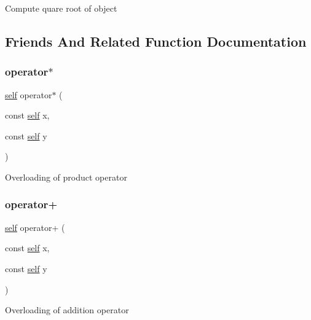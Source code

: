 Compute quare root of object 

\subsection{Friends And Related Function Documentation}
\mbox{\label{classez_1_1objects_1_1Real_a4f9af882c7a074ed8e1f8da41bd31dc9}} 
\subsubsection{\texorpdfstring{operator$\ast$}{operator*}}
{\footnotesize\ttfamily \hyperlink{classez_1_1objects_1_1Real}{self} operator$\ast$ (\begin{DoxyParamCaption}\item[{const \hyperlink{classez_1_1objects_1_1Real}{self}}]{x,  }\item[{const \hyperlink{classez_1_1objects_1_1Real}{self}}]{y }\end{DoxyParamCaption})\hspace{0.3cm}{\ttfamily [friend]}}

Overloading of product operator \mbox{\label{classez_1_1objects_1_1Real_ac219ecb06730e7707b9bb78b5da63c3b}} 
\subsubsection{\texorpdfstring{operator+}{operator+}}
{\footnotesize\ttfamily \hyperlink{classez_1_1objects_1_1Real}{self} operator+ (\begin{DoxyParamCaption}\item[{const \hyperlink{classez_1_1objects_1_1Real}{self}}]{x,  }\item[{const \hyperlink{classez_1_1objects_1_1Real}{self}}]{y }\end{DoxyParamCaption})\hspace{0.3cm}{\ttfamily [friend]}}

Overloading of addition operator \mbox{\label{classez_1_1objects_1_1Real_a6750cba02a1d652b1bd892bfba555e50}} 
